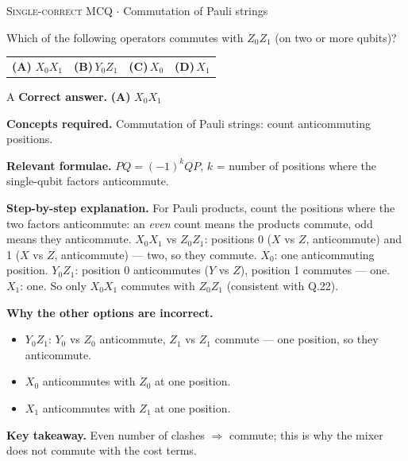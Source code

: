 \documentclass[11pt,a4paper]{article}
\newcommand{\optlabel}[1]{\textbf{(#1)}}
\newcommand{\correctlabel}[1]{\textcolor{okgreen}{\textbf{(#1)}\,\ding{51}}}
\newenvironment{qitem}[1]{\begin{list}{}{\setlength{\leftmargin}{3.3em}\setlength{\labelwidth}{3.1em}%
  \setlength{\labelsep}{0.2em}\setlength{\topsep}{3pt}\setlength{\parsep}{3pt}}\item[\textbf{Q.#1}\hfill]}{\end{list}}
\newcommand{\qsep}{\par\vspace{2pt}{\color{black!15}\hrule}\vspace{4pt}}
\newcommand{\qmeta}[2]{{\footnotesize\color{black!60}\textsc{#1} \;$\cdot$\; #2}\par}
\begin{document}
\begin{qitem}{26}
\qmeta{Single-correct MCQ}{Commutation of Pauli strings}
Which of the following operators commutes with $Z_0Z_1$ (on two or more qubits)?
\par\smallskip\noindent\begin{tabularx}{\linewidth}{@{}*{4}{L}@{}}
\correctlabel{A}\,$X_0X_1$ & \optlabel{B}\,$Y_0Z_1$ & \optlabel{C}\,$X_0$ & \optlabel{D}\,$X_1$
\end{tabularx}
\end{qitem}
\begin{solbox}{A}
\textbf{\color{brand}Correct answer.} \textcolor{okgreen}{\textbf{(A)}} $X_0X_1$

\textbf{\color{brand}Concepts required.} Commutation of Pauli strings: count anticommuting positions.

\textbf{\color{brand}Relevant formulae.} $PQ = (-1)^{k}QP$, $k$ = number of positions where the single-qubit factors anticommute.

\textbf{\color{brand}Step-by-step explanation.} For Pauli products, count the positions where the two factors anticommute: an \emph{even} count means the products
commute, odd means they anticommute.
$X_0X_1$ vs $Z_0Z_1$: positions 0 ($X$ vs $Z$, anticommute) and 1 ($X$ vs $Z$, anticommute) --- two, so they commute.
$X_0$: one anticommuting position. $Y_0Z_1$: position 0 anticommutes ($Y$ vs $Z$), position 1 commutes --- one.
$X_1$: one. So only $X_0X_1$ commutes with $Z_0Z_1$ (consistent with Q.22).

\textbf{\color{brand}Why the other options are incorrect.}
\begin{itemize}[leftmargin=2.4em, itemsep=1pt, topsep=2pt]
\item[\textbf{(B)}] $Y_0Z_1$: $Y_0$ vs $Z_0$ anticommute, $Z_1$ vs $Z_1$ commute --- one position, so they anticommute.
\item[\textbf{(C)}] $X_0$ anticommutes with $Z_0$ at one position.
\item[\textbf{(D)}] $X_1$ anticommutes with $Z_1$ at one position.
\end{itemize}
\textbf{\color{brand}Key takeaway.} Even number of clashes $\Rightarrow$ commute; this is why the mixer does not commute with the cost terms.
\end{solbox}
\qsep
\end{document}
